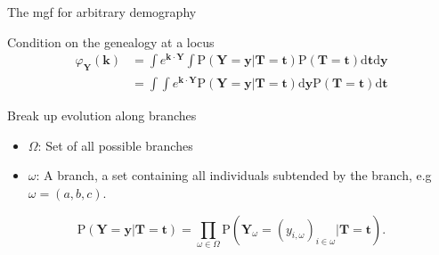 \documentclass{beamer}
\newcommand{\Pro}{\mathrm{P}}
\begin{document}
\begin{frame}{The mgf for arbitrary demography}
  \begin{block}{Condition on the genealogy at a locus}
    \begin{align}
      \varphi_{\mathbf{Y}}(\mathbf{k}) &= \int e^{\mathbf{k} \cdot \mathbf{Y}}
      \int \Pro(\mathbf{Y}=\mathbf{y} | \mathbf{T}=\mathbf{t}) \Pro(\mathbf{T}=\mathbf{t})
      \mbox{d}\mathbf{t} \mbox{d}\mathbf{y}\\
      &= \int \int e^{\mathbf{k} \cdot \mathbf{Y}} \Pro(\mathbf{Y}=\mathbf{y} | \mathbf{T}=\mathbf{t}) \mbox{d}\mathbf{y}
      \Pro(\mathbf{T}=\mathbf{t})
      \mbox{d}\mathbf{t}
    \end{align}  
  \end{block}
  \begin{block}{Break up evolution along branches}
    \begin{itemize}
    \item $\Omega$: Set of all possible branches 
    \item $\omega$: A branch, a set containing all individuals subtended by the
      branch, e.g $\omega = (a,b,c)$.
    \end{itemize}
    \begin{equation*}
      \Pro(\mathbf{Y}=\mathbf{y}|\mathbf{T}=\mathbf{t}) = \prod_{\omega \in \Omega}
      \Pro(\mathbf{Y}_{\omega}=(y_{i,\omega})_{i \in \omega} | \mathbf{T}=\mathbf{t}).  
    \end{equation*}
  \end{block}
\end{frame}
\end{document}

